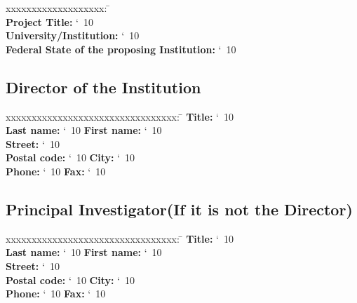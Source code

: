 \documentclass[accentcolor=tud9c,nochapname,11pt]{tudexercise}
\makeatletter
\newcommand\saferead[1]{%
  \bgroup
  \let\do\@makeother
  \dospecials\catcode`\ 10
  \egroup 
}
\makeatother
\begin{document}
\begin{Form}
\begin{tabbing}
xxxxxxxxxxxxxxxxxxx: \= \kill  \\%
\textbf{Project Title:}  \saferead{proj_title.txt} \\
\textbf{University/Institution:}  \saferead{prop_inst.txt} \\
\textbf{Federal State of the proposing Institution:}  \saferead{prop_state.txt} \\
\end{tabbing}
\subsection{Director of the Institution}
\begin{tabbing}
xxxxxxxxxxxxxxxxxxxxxxxxxxxxxxxxx:  \= \kill
\textbf{Title:}   \saferead{dir_title.txt} \\
\textbf{Last name:} \saferead{dir_lname.txt}  \> \>  \textbf{First name:} \saferead{dir_fname.txt}  \\
\textbf{Street:} \saferead{dir_street.txt}  \\
\textbf{Postal code:} \saferead{dir_pcode.txt}  \> \> \textbf{City:} \saferead{dir_city.txt}  \\
\textbf{Phone:} \saferead{dir_phone.txt} \> \> \textbf{Fax:} \saferead{dir_fax.txt}  \\
\end{tabbing}
\subsection{Principal Investigator(If it is not the Director)}
\begin{tabbing}
xxxxxxxxxxxxxxxxxxxxxxxxxxxxxxxxx:  \= \kill
\textbf{Title:} \saferead{pi_title.txt} \\
\textbf{Last name:} \saferead{pi_lname.txt}  \> \>  \textbf{First name:} \saferead{pi_fname.txt}  \\
\textbf{Street:} \saferead{pi_street.txt}  \\
\textbf{Postal code:} \saferead{pi_pcode.txt}   \> \> \textbf{City:} \saferead{pi_city.txt}  \\
\textbf{Phone:} \saferead{pi_phone.txt}  \> \> \textbf{Fax:} \saferead{pi_fax.txt}  \\
\end{tabbing}

\end{Form}
\end{document}
